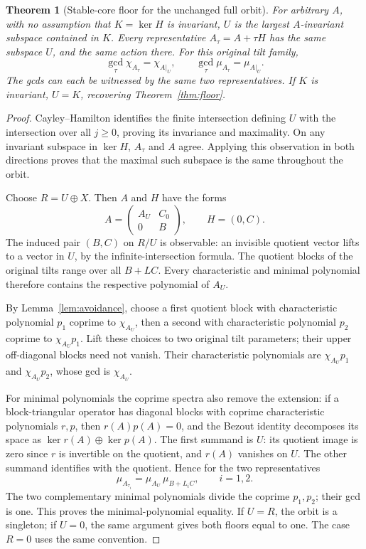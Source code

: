 \documentclass[11pt]{amsart}
\newtheorem{theorem}{Theorem}[section]
\theoremstyle{definition}
\begin{document}
\begin{theorem}[Stable-core floor for the unchanged full orbit]\label{thm:stable-floor}
For arbitrary \(A\), with no assumption that \(K=\ker H\) is invariant, \(U\)
is the largest \(A\)-invariant subspace contained in \(K\). Every representative
\(A_\tau=A+\tau H\) has the same subspace \(U\), and the same action there.
For this original tilt family,
\[
\boxed{\gcd_\tau\chi_{A_\tau}=\chi_{A|_U},\qquad
       \gcd_\tau\mu_{A_\tau}=\mu_{A|_U}.}
\]
The gcds can each be witnessed by the same two representatives.
If \(K\) is invariant, \(U=K\), recovering Theorem~\ref{thm:floor}.
\end{theorem}
\begin{proof}
Cayley--Hamilton identifies the finite intersection defining \(U\) with the
intersection over all \(j\ge0\), proving its invariance and maximality.
On any invariant subspace in \(\ker H\), \(A_\tau\) and \(A\) agree.
Applying this observation in both directions proves that the maximal such
subspace is the same throughout the orbit.

Choose \(R=U\oplus X\). Then \(A\) and \(H\) have the forms
\[
A=\begin{pmatrix}A_U&C_0\\0&B\end{pmatrix},
\qquad H=(0,C).
\]
The induced pair \((B,C)\) on \(R/U\) is observable: an invisible quotient
vector lifts to a vector in \(U\), by the infinite-intersection formula.
The quotient blocks of the original tilts range over all \(B+LC\).
Every characteristic and minimal polynomial therefore contains the respective
polynomial of \(A_U\).

By Lemma~\ref{lem:avoidance}, choose a first quotient block with characteristic
polynomial \(p_1\) coprime to \(\chi_{A_U}\), then a second with characteristic
polynomial \(p_2\) coprime to \(\chi_{A_U}p_1\).
Lift these choices to two original tilt parameters; their upper off-diagonal
blocks need not vanish. Their characteristic polynomials are
\(\chi_{A_U}p_1\) and \(\chi_{A_U}p_2\), whose gcd is \(\chi_{A_U}\).

For minimal polynomials the coprime spectra also remove the extension:
if a block-triangular operator has diagonal blocks with coprime characteristic
polynomials \(r,p\), then \(r(A)p(A)=0\), and the Bezout identity decomposes
its space as \(\ker r(A)\oplus\ker p(A)\).
The first summand is \(U\): its quotient image is zero since \(r\) is invertible
on the quotient, and \(r(A)\) vanishes on \(U\).
The other summand identifies with the quotient.
Hence for the two representatives
\[
\mu_{A_{\tau_i}}=\mu_{A_U}\,\mu_{B+L_iC},\qquad i=1,2.
\]
The two complementary minimal polynomials divide the coprime \(p_1,p_2\);
their gcd is one. This proves the minimal-polynomial equality.
If \(U=R\), the orbit is a singleton; if \(U=0\), the same argument gives
both floors equal to one. The case \(R=0\) uses the same convention.
\end{proof}
\end{document}
